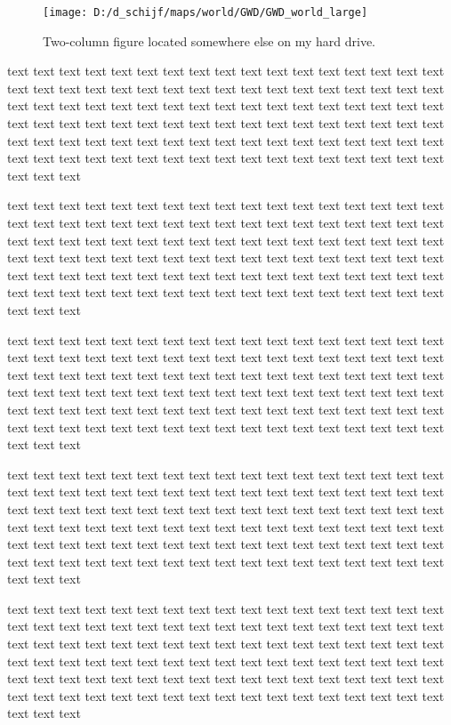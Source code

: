 \documentclass[twocolumn, 10pt, a4paper]{memoir}
\begin{document}
\begin{figure}[t]
\center
\texttt{[image: D:/d\_schijf/maps/world/GWD/GWD\_world\_large]}
\caption{Two-column figure located somewhere else on my hard drive.}
\label{fig: GWD world}
\end{figure}

text text text text text text text text text text text text text text text text text text text text text
text text text text text text text text text text text text text text text text text text text text text
text text text text text text text text text text text text text text text text text text text text text
text text text text text text text text text text text text text text text text text text text text text
text text text text text text text text text text text text text text text text text text text text text

text text text text text text text text text text text text text text text text text text text text text
text text text text text text text text text text text text text text text text text text text text text
text text text text text text text text text text text text text text text text text text text text text
text text text text text text text text text text text text text text text text text text text text text
text text text text text text text text text text text text text text text text text text text text text

text text text text text text text text text text text text text text text text text text text text text
text text text text text text text text text text text text text text text text text text text text text
text text text text text text text text text text text text text text text text text text text text text
text text text text text text text text text text text text text text text text text text text text text
text text text text text text text text text text text text text text text text text text text text text

text text text text text text text text text text text text text text text text text text text text text
text text text text text text text text text text text text text text text text text text text text text
text text text text text text text text text text text text text text text text text text text text text
text text text text text text text text text text text text text text text text text text text text text
text text text text text text text text text text text text text text text text text text text text text

text text text text text text text text text text text text text text text text text text text text text
text text text text text text text text text text text text text text text text text text text text text
text text text text text text text text text text text text text text text text text text text text text
text text text text text text text text text text text text text text text text text text text text text
text text text text text text text text text text text text text text text text text text text text text
\end{document}
